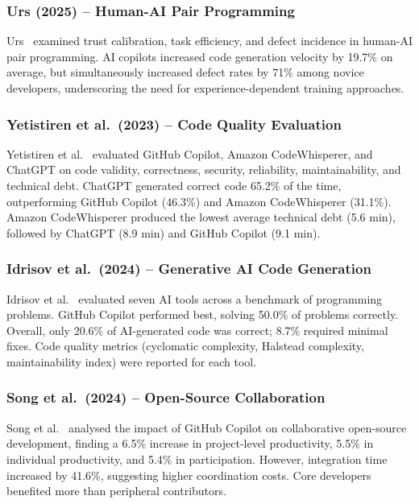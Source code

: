 \documentclass[journal,twoside,10pt]{IEEEtran}
\begin{document}
\subsubsection{Urs (2025) -- Human-AI Pair Programming}
Urs~\cite{urs2025trust} examined trust calibration, task efficiency, and defect
incidence in human-AI pair programming. AI copilots increased code generation
velocity by 19.7\% on average, but simultaneously increased defect rates by
71\% among novice developers, underscoring the need for experience-dependent
training approaches.

\subsubsection{Yetistiren et al.\ (2023) -- Code Quality Evaluation}
Yetistiren et al.~\cite{yetistiren2023quality} evaluated GitHub Copilot, Amazon
CodeWhisperer, and ChatGPT on code validity, correctness, security, reliability,
maintainability, and technical debt. ChatGPT generated correct code 65.2\% of
the time, outperforming GitHub Copilot (46.3\%) and Amazon CodeWhisperer
(31.1\%). Amazon CodeWhisperer produced the lowest average technical debt
(5.6 min), followed by ChatGPT (8.9 min) and GitHub Copilot (9.1 min).

\subsubsection{Idrisov et al.\ (2024) -- Generative AI Code Generation}
Idrisov et al.~\cite{idrisov2024codegen} evaluated seven AI tools across a
benchmark of programming problems. GitHub Copilot performed best, solving 50.0\%
of problems correctly. Overall, only 20.6\% of AI-generated code was correct;
8.7\% required minimal fixes. Code quality metrics (cyclomatic complexity,
Halstead complexity, maintainability index) were reported for each tool.

\subsubsection{Song et al.\ (2024) -- Open-Source Collaboration}
Song et al.~\cite{song2024opensource} analysed the impact of GitHub Copilot on
collaborative open-source development, finding a 6.5\% increase in project-level
productivity, 5.5\% in individual productivity, and 5.4\% in participation.
However, integration time increased by 41.6\%, suggesting higher coordination
costs. Core developers benefited more than peripheral contributors.
\end{document}
